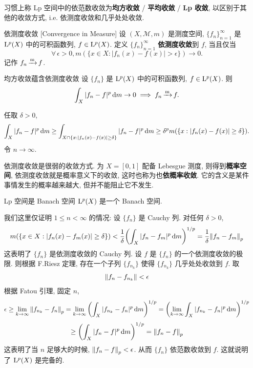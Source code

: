         \begin{rmk}
            [Dedicatia]
            习惯上称 Lp 空间中的依范数收敛为\textbf{均方收敛} / \textbf{平均收敛} / \textbf{Lp 收敛}, 以区别于其他的收敛方式, i.e. 依测度收敛和几乎处处收敛.
        \end{rmk}

        \begin{vardfn}
            {依测度收敛}
            [Convergence in Measure]
            设 \((X, \mathcal{M}, m)\) 是测度空间, \(\{f_n\}_{n=1}^{\infty}\) 是 \(\Lp(X)\) 中的可积函数列, \(f\in \Lp(X)\). 定义 \(\{f_n\}_{n=1}^{\infty}\) \textbf{依测度收敛}到 \(f\), 当且仅当 
            \[\forall\,\epsilon>0, m(\{x\in X: |f_n(x)-f(x)|>\epsilon\})\to 0.\]
            记作 \(f_n\operatorname{\xrightarrow{m}} f\).
        \end{vardfn}

        \begin{varthm}
            {均方收敛蕴含依测度收敛}
            设 \(\{f_n\}\) 是 \(\Lp(X)\) 中的可积函数列, \(f\in \Lp(X)\). 则
            \[\int_X |f_n-f|^p \dd{m} \to 0 \implies f_n\operatorname{\xrightarrow{m}} f.\]
        \end{varthm}

        \begin{prf}
            任取 \(\delta>0\), 
            \[\int_X|f_n-f|^p\dd{m}\geq\int_{X\cap \{x:|f_n(x)-f(x)|\geq\delta\}}|f_n-f|^p\dd{m}\geq\delta^p m\qty(\{x:|f_n(x)-f(x)|\geq\delta\}).\]
            令 \(n\to\infty\).
        \end{prf}

        \begin{rmk}
            [Dedicatia]
            依测度收敛是很弱的收敛方式. 为 \(X=[0,1]\) 配备 Lebesgue 测度, 则得到\textbf{概率空间}, 依测度收敛就是概率意义下的收敛, 这时也称为也\textbf{依概率收敛}. 它的含义是某件事情发生的概率越来越大, 但并不能阻止它不发生.
        \end{rmk}

        \begin{varthm}
            {Lp 空间是 Banach 空间}
            \(\Lp(X)\) 是一个 Banach 空间.
        \end{varthm}

        \begin{prf}
            我们这里仅证明 \(1\leq n<\infty\) 的情况:
            设 \(\{f_n\}\) 是 Cauchy 列. 对任何 \(\delta>0\), 
            \[m(\{x\in X : |f_n(x)-f_m(x)|\geq\delta\}) < \frac{1}{\delta}\qty(\int_X |f_n-f_m|^p \dd{m})^{1/p}=\frac{1}{\delta} \norm{f_n-f_m}_p\]
            这表明了 \(\{f_n\}\) 是依测度收敛的 Cauchy 列. 设 \(f\) 是 \(\{f_n\}\) 的一个依测度收敛的极限. 则根据 F.Riesz 定理, 存在一个子列 \(\{f_{n_k}\}\) 使得 \(\{f_{n_k}\}\) 几乎处处收敛到 \(f\). 取 
            \[\norm{f_n-f_{n_k}}<\epsilon\]
            根据 Fatou 引理, 固定 \(n\),
            \[\epsilon\geq\lim_{k\to\infty}\norm{f_{n_k}-f_n}_p=\lim_{k\to\infty}\qty(\int_X |f_{n_k}-f_n|^p \dd{m})^{1/p}=\qty(\lim_{k\to\infty}\int_X |f_{n_k}-f_n|^p \dd{m})^{1/p}\]
            \[\geq\qty(\int_X |f_n-f|^p \dd{m})^{1/p}=\norm{f_n-f}_p\]
            这表明了当 \(n\) 足够大的时候, \(\norm{f_n-f}_p<\epsilon\). 从而 \(\{f_n\}\) 依范数收敛到 \(f\). 这就说明了 \(\Lp(X)\) 是完备的.
        \end{prf}

